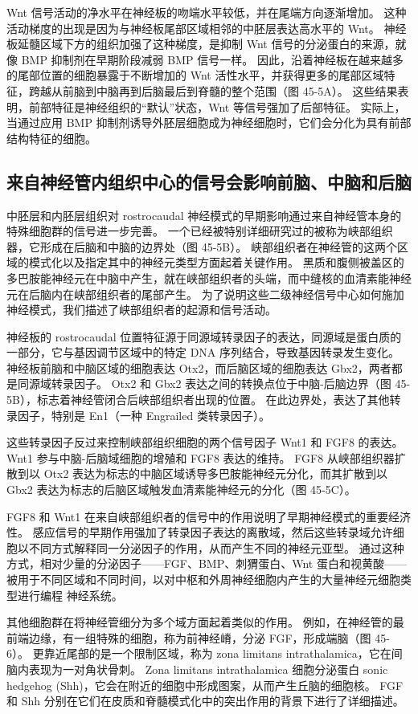 Wnt 信号活动的净水平在神经板的吻端水平较低，并在尾端方向逐渐增加。 这种活动梯度的出现是因为与神经板尾部区域相邻的中胚层表达高水平的 Wnt。 神经板延髓区域下方的组织加强了这种梯度，是抑制 Wnt 信号的分泌蛋白的来源，就像 BMP 抑制剂在早期阶段减弱 BMP 信号一样。 因此，沿着神经板在越来越多的尾部位置的细胞暴露于不断增加的 Wnt 活性水平，并获得更多的尾部区域特征，跨越从前脑到中脑再到后脑最后到脊髓的整个范围（图 45-5A）。 这些结果表明，前部特征是神经组织的“默认”状态，Wnt 等信号强加了后部特征。 实际上，当通过应用 BMP 抑制剂诱导外胚层细胞成为神经细胞时，它们会分化为具有前部结构特征的细胞。

\subsection{来自神经管内组织中心的信号会影响前脑、中脑和后脑}
中胚层和内胚层组织对 rostrocaudal 神经模式的早期影响通过来自神经管本身的特殊细胞群的信号进一步完善。 一个已经被特别详细研究过的被称为峡部组织器，它形成在后脑和中脑的边界处（图 45-5B）。 峡部组织者在神经管的这两个区域的模式化以及指定其中的神经元类型方面起着关键作用。 黑质和腹侧被盖区的多巴胺能神经元在中脑中产生，就在峡部组织者的头端，而中缝核的血清素能神经元在后脑内在峡部组织者的尾部产生。 为了说明这些二级神经信号中心如何施加神经模式，我们描述了峡部组织者的起源和信号活动。

神经板的 rostrocaudal 位置特征源于同源域转录因子的表达，同源域是蛋白质的一部分，它与基因调节区域中的特定 DNA 序列结合，导致基因转录发生变化。 神经板前脑和中脑区域的细胞表达 Otx2，而后脑区域的细胞表达 Gbx2，两者都是同源域转录因子。 Otx2 和 Gbx2 表达之间的转换点位于中脑-后脑边界（图 45-5B），标志着神经管闭合后峡部组织者出现的位置。 在此边界处，表达了其他转录因子，特别是 En1（一种 Engrailed 类转录因子）。

这些转录因子反过来控制峡部组织细胞的两个信号因子 Wnt1 和 FGF8 的表达。 Wnt1 参与中脑-后脑域细胞的增殖和 FGF8 表达的维持。 FGF8 从峡部组织器扩散到以 Otx2 表达为标志的中脑区域诱导多巴胺能神经元分化，而其扩散到以 Gbx2 表达为标志的后脑区域触发血清素能神经元的分化（图 45-5C）。

FGF8 和 Wnt1 在来自峡部组织者的信号中的作用说明了早期神经模式的重要经济性。 感应信号的早期作用强加了转录因子表达的离散域，然后这些转录域允许细胞以不同方式解释同一分泌因子的作用，从而产生不同的神经元亚型。 通过这种方式，相对少量的分泌因子——FGF、BMP、刺猬蛋白、Wnt 蛋白和视黄酸——被用于不同区域和不同时间，以对中枢和外周神经细胞内产生的大量神经元细胞类型进行编程 神经系统。

其他细胞群在将神经管细分为多个域方面起着类似的作用。 例如，在神经管的最前端边缘，有一组特殊的细胞，称为前神经嵴，分泌 FGF，形成端脑（图 45-6）。 更靠近尾部的是一个限制区域，称为 zona limitans intrathalamica，它在间脑内表现为一对角状骨刺。 Zona limitans intrathalamica 细胞分泌蛋白 sonic hedgehog (Shh)，它会在附近的细胞中形成图案，从而产生丘脑的细胞核。 FGF 和 Shh 分别在它们在皮质和脊髓模式化中的突出作用的背景下进行了详细描述。

